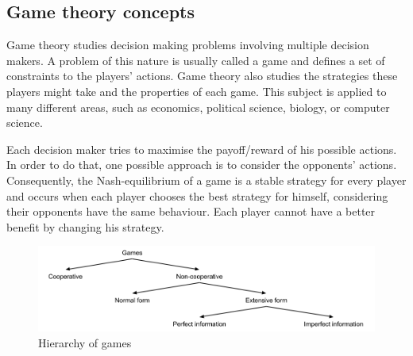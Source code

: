 \subsection{Game theory concepts}

Game theory studies decision making problems involving multiple decision makers.
A problem of this nature is usually called a game and defines a set of constraints to the players' actions.
Game theory also studies the strategies these players might take and the properties of each game.
This subject is applied to many different areas, such as economics, political science, biology, or computer science.

Each decision maker tries to maximise the payoff/reward of his possible actions.
In order to do that, one possible approach is to consider the opponents' actions.
Consequently, the Nash-equilibrium \cite{Nash1950} of a game is a stable strategy for every player and occurs when each player chooses the best strategy for himself, considering their opponents have the same behaviour.
Each player cannot have a better benefit by changing his strategy.

\begin{figure}
\centering
\includegraphics[width=1\textwidth]{./img/gamesHierarchy}
\caption{Hierarchy of games}
\label{fig:games}
\end{figure}

